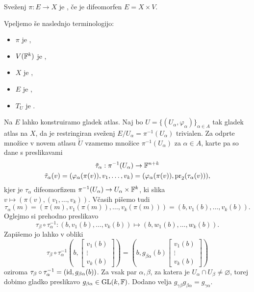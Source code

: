 \begin{definition}
  Sveženj $\pi: E \to X$ je , če je difeomorfen $E = X
  \times V$.
\end{definition}

Vpeljemo še naslednjo terminologijo:
\begin{itemize}
\item $\pi$ je ,
\item $V(\mathbb{F}^k)$ je ,
\item $X$ je ,
\item $E$ je ,
\item $T_U$ je .
\end{itemize}

Na $E$ lahko konstruiramo gladek atlas.
Naj bo $U = \{ (U_\alpha, \varphi_\alpha) \}_{\alpha \in A}$ tak gladek atlas na
$X$, da je restringiran sveženj $E/U_\alpha = \pi^{-1}(U_\alpha)$ trivialen.
Za odprte množice v novem atlasu $\tilde{U}$ vzamemo množice
$\pi^{-1}(U_\alpha)$ za $\alpha \in A$, karte pa so dane s preslikavami
\begin{gather*}
  \tilde{\tau}_\alpha: \pi^{-1}(U_\alpha) \to \mathbb{F}^{n+k} \\
  \tilde{\tau}_\alpha(v)
  = ( \varphi_\alpha(\pi(v)), v_1, \ldots, v_k )
  = ( \varphi_\alpha(\pi(v)), \operatorname{pr}_2(\tau_\alpha(v)) ),
\end{gather*}
kjer je $\tau_\alpha$ difeomorfizem $\pi^{-1}(U_\alpha) \to U_\alpha \times
\mathbb{F}^k$, ki slika $v \mapsto (\pi(v), (v_1, \ldots, v_k))$.
Včasih pišemo tudi
\[
  \tau_\alpha(m) = (\pi(m), v_1(\pi(m)), \ldots, v_k(\pi(m)))
  = (b, v_1(b), \ldots, v_k(b)).
\]
Oglejmo si prehodno preslikavo
\[
  \tau_\beta \circ \tau_\alpha^{-1}
  : (b, v_1(b), \ldots, v_k(b)) \mapsto (b, w_1(b), \ldots, w_k(b)).
\]
Zapišemo jo lahko v obliki
\[
  \tau_\beta \circ \tau_\alpha^{-1}
  \left(
	b,
	\begin{bmatrix}
	  v_1(b) \\ \vdots \\ v_k(b)
	\end{bmatrix}
  \right)
  = \left(
	b,
	g_{\beta \alpha}(b)
	\begin{bmatrix}
	  v_1(b) \\ \vdots \\ v_k(b)
	\end{bmatrix}
  \right)
\]
oziroma $\tau_\beta \circ \tau_\alpha^{-1} = (\operatorname{id}, g_{\beta \alpha}(b))$.
Za vsak par $\alpha, \beta$, za katera je $U_\alpha \cap U_\beta \ne
\varnothing$, torej dobimo gladko preslikavo $g_{\beta \alpha} \in \operatorname{GL}(k, \mathbb{F})$.
Dodano velja $g_{\gamma \beta} g_{\beta \alpha} = g_{\gamma \alpha}$.

